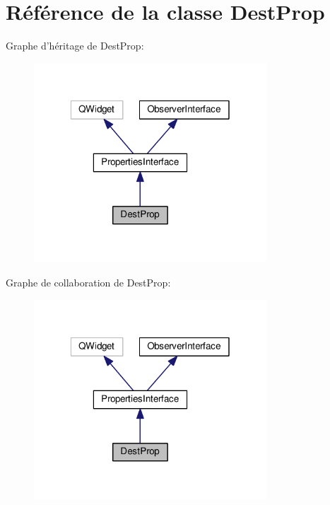 \hypertarget{classDestProp}{\section{Référence de la classe Dest\+Prop}
\label{classDestProp}
}


Graphe d'héritage de Dest\+Prop\+:
\nopagebreak
\begin{figure}[H]
\begin{center}
\leavevmode
\includegraphics[width=247pt]{d4/d2d/classDestProp__inherit__graph}
\end{center}
\end{figure}


Graphe de collaboration de Dest\+Prop\+:
\nopagebreak
\begin{figure}[H]
\begin{center}
\leavevmode
\includegraphics[width=247pt]{d4/d2b/classDestProp__coll__graph}
\end{center}
\end{figure}
